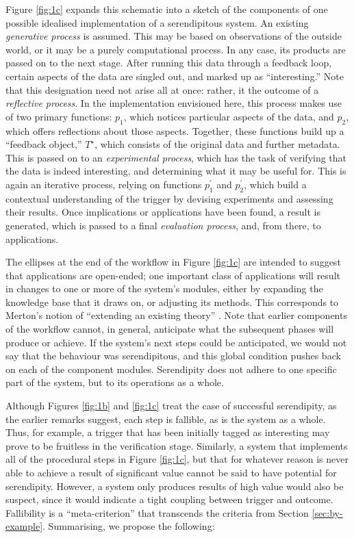 Figure \ref{fig:1c} expands this schematic into a sketch of the
components of one possible idealised implementation of a serendipitous
system.  An existing \emph{generative process} is assumed.  This may
be based on observations of the outside world, or it may be a purely
computational process.  In any case, its products are passed on to the
next stage.  After running this data through a feedback loop, certain
aspects of the data are singled out, and marked up as
``interesting.''  Note that this designation need not arise all at
once: rather, it the outcome of a \emph{reflective process}.  In the
implementation envisioned here, this process makes use of two primary
functions: $p_1$, which notices particular aspects of the data, and $p_2$, which
offers reflections about those aspects.  Together, these functions build up a
``feedback object,'' $T^{\star}$, which consists of the original data
and further metadata.  This is passed on to an \emph{experimental
  process}, which has the task of verifying that the data
is indeed interesting, and determining what it may be useful for.
This is again an iterative process, relying on functions $p^{\prime}_1$ and $p^{\prime}_2$, which
build a contextual understanding of the trigger by devising experiments and
assessing their results.  Once implications or applications have been found, a result is
generated, which is passed to a final \emph{evaluation process}, and,
from there, to applications.

The ellipses at the end of the workflow in Figure \ref{fig:1c} are
intended to suggest that applications are open-ended; one
important class of applications will result in changes to one or more
of the system's modules, either by expanding the knowledge base
that it draws on, or adjusting its methods.
This corresponds to Merton's notion of ``extending an existing theory''
\cite{merton1948bearing}.
Note that earlier components of the workflow
cannot, in general, anticipate what the subsequent phases will produce
or achieve.  If the system's next steps could be anticipated, we would
not say that the behaviour was serendipitous, and this global condition pushes back on each of the component modules.  
Serendipity does not adhere to one specific part of the system, but to
its operations as a whole.  

Although Figures \ref{fig:1b} and \ref{fig:1c} treat the case of
successful serendipity, as the earlier remarks suggest, each step is
fallible, as is the system as a whole.  Thus, for example, a trigger
that has been initially tagged as interesting may prove to be
fruitless in the verification stage.  Similarly, a system that
implements all of the procedural steps in Figure \ref{fig:1c}, but that for
whatever reason is never able to achieve a result of significant value
cannot be said to have potential for serendipity.  However, a system
only produces results of high value would also be suspect, since it
would indicate a tight coupling between trigger and outcome.
Fallibility is a ``meta-criterion'' that transcends the criteria from
Section \ref{sec:by-example}.  Summarising, we propose the following:

